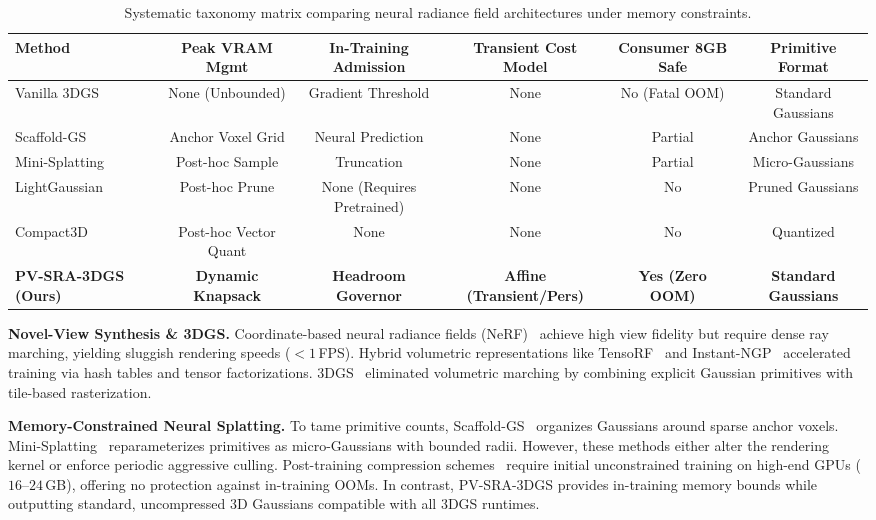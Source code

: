 \documentclass[10pt,twocolumn,letterpaper]{article}
\begin{document}
\begin{table}[t]
\centering
\small
\caption{Systematic taxonomy matrix comparing neural radiance field architectures under memory constraints.}
\label{tab:taxonomy}
\begin{tabular}{lccccc}
\toprule
\textbf{Method} & \textbf{Peak VRAM Mgmt} & \textbf{In-Training Admission} & \textbf{Transient Cost Model} & \textbf{Consumer 8GB Safe} & \textbf{Primitive Format} \\
\midrule
Vanilla 3DGS~\cite{kerbl20233d} & None (Unbounded) & Gradient Threshold & None & No (Fatal OOM) & Standard Gaussians \\
Scaffold-GS~\cite{lu2024scaffoldgs} & Anchor Voxel Grid & Neural Prediction & None & Partial & Anchor Gaussians \\
Mini-Splatting~\cite{fang2024mini} & Post-hoc Sample & Truncation & None & Partial & Micro-Gaussians \\
LightGaussian~\cite{fan2024lightgaussian} & Post-hoc Prune & None (Requires Pretrained) & None & No & Pruned Gaussians \\
Compact3D~\cite{lee2024compact3dgs} & Post-hoc Vector Quant & None & None & No & Quantized \\
\textbf{PV-SRA-3DGS (Ours)} & \textbf{Dynamic Knapsack} & \textbf{Headroom Governor} & \textbf{Affine (Transient/Pers)} & \textbf{Yes (Zero OOM)} & \textbf{Standard Gaussians} \\
\bottomrule
\end{tabular}
\end{table}

\textbf{Novel-View Synthesis \& 3DGS.} Coordinate-based neural radiance fields (NeRF)~\cite{mildenhall2020nerf,barron2021mipnerf,barron2022mipnerf360} achieve high view fidelity but require dense ray marching, yielding sluggish rendering speeds ($<1$\,FPS). Hybrid volumetric representations like TensoRF~\cite{chen2022tensorf} and Instant-NGP~\cite{muller2022instant} accelerated training via hash tables and tensor factorizations. 3DGS~\cite{kerbl20233d} eliminated volumetric marching by combining explicit Gaussian primitives with tile-based rasterization.

\textbf{Memory-Constrained Neural Splatting.} To tame primitive counts, Scaffold-GS~\cite{lu2024scaffoldgs} organizes Gaussians around sparse anchor voxels. Mini-Splatting~\cite{fang2024mini} reparameterizes primitives as micro-Gaussians with bounded radii. However, these methods either alter the rendering kernel or enforce periodic aggressive culling. Post-training compression schemes~\cite{fan2024lightgaussian,lee2024compact3dgs,girish2024eagles} require initial unconstrained training on high-end GPUs ($16\text{--}24$\,GB), offering no protection against in-training OOMs. In contrast, PV-SRA-3DGS provides in-training memory bounds while outputting standard, uncompressed 3D Gaussians compatible with all 3DGS runtimes.
\end{document}

